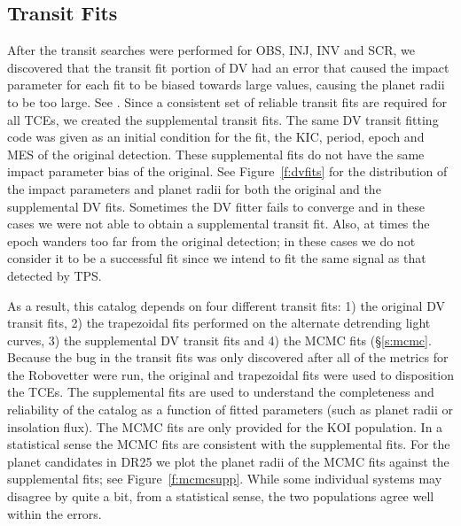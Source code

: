 \subsection{Transit Fits}

After the transit searches were performed for OBS, INJ, INV and SCR, we discovered that the transit fit portion of DV had an error that caused the impact parameter for each fit to be biased towards large values, causing the planet radii to be too large. See \citet{KSCI19110}. Since a consistent set of reliable transit fits are required for all TCEs, we created the supplemental transit fits.  The same DV transit fitting code was given as an initial condition for the fit, the KIC, period, epoch and MES of the original detection. These supplemental fits do not have the same impact parameter bias of the original. See Figure~\ref{f:dvfits} for the distribution of the impact parameters and planet radii for both the original and the supplemental DV fits.  Sometimes the DV fitter fails to converge and in these cases we were not able to obtain a supplemental transit fit. Also, at times the epoch wanders too far from the original detection; in these cases we do not consider it to be a successful fit since we intend to fit the same signal as that detected by TPS.

As a result, this catalog depends on four different transit fits: 1) the original DV transit fits, 2) the trapezoidal fits performed on the alternate detrending light curves, 3) the supplemental DV transit fits and 4) the MCMC fits (\S\ref{s:mcmc}.  Because the bug in the transit fits was only discovered after all of the metrics for the Robovetter were run, the original and trapezoidal fits were used to disposition the TCEs.  The supplemental fits are used to understand the completeness and reliability of the catalog as a function of fitted parameters (such as planet radii or insolation flux).  The MCMC fits are only provided for the KOI population. In a statistical sense the MCMC fits are consistent with the supplemental fits. %
For the planet candidates in DR25 we plot the planet radii of the MCMC fits against the supplemental fits; see Figure~\ref{f:mcmcsupp}. While some individual systems may disagree by quite a bit, from a statistical sense, the two populations agree well within the errors. 

